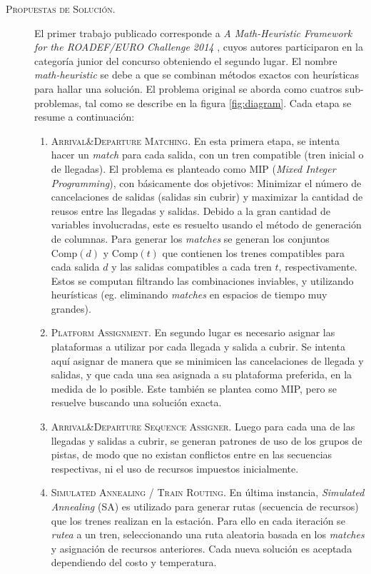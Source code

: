 \documentclass[letter, 10pt]{article}
\begin{document}
\begin{description}
    \item[\textsc{Propuestas de Solución.}]
    El primer trabajo publicado corresponde a \textit{A Math-Heuristic Framework for the ROADEF/EURO Challenge 2014} \cite{MathHeuristic}, cuyos autores participaron en la categoría junior del concurso obteniendo el segundo lugar. El nombre \textit{math-heuristic} se debe a que se combinan métodos exactos con heurísticas para hallar una solución. El problema original se aborda como cuatros sub-problemas, tal como se describe en la figura \ref{fig:diagram}. Cada etapa se resume a continuación:
    \begin{enumerate}
        \item \textsc{Arrival\&Departure Matching}. En esta primera etapa, se intenta hacer un \textit{match} para cada salida, con un tren compatible (tren inicial o de llegadas). El problema es planteado como MIP (\textit{Mixed Integer Programming}), con básicamente dos objetivos: Minimizar el número de cancelaciones de salidas (salidas sin cubrir) y maximizar la cantidad de reusos entre las llegadas y salidas. Debido a la gran cantidad de variables involucradas, este es resuelto usando el método de generación de columnas. Para generar los \textit{matches} se generan los conjuntos $\text{Comp}(d)$ y $\text{Comp}(t)$ que contienen los trenes compatibles para cada salida $d$ y las salidas compatibles a cada tren $t$, respectivamente. Estos se computan filtrando las combinaciones inviables, y utilizando heurísticas (eg. eliminando \textit{matches} en espacios de tiempo muy grandes).
        \item \textsc{Platform Assignment}. En segundo lugar es necesario asignar las plataformas a utilizar por cada llegada y salida a cubrir. Se intenta aquí asignar de manera que se minimicen las cancelaciones de llegada y salidas, y que cada una sea asignada a su plataforma preferida, en la medida de lo posible. Este también se plantea como MIP, pero se resuelve buscando una solución exacta.
        \item \textsc{Arrival\&Departure Sequence Assigner}. Luego para cada una de las llegadas y salidas a cubrir, se generan patrones de uso de los grupos de pistas, de modo que no existan conflictos entre en las secuencias respectivas, ni el uso de recursos impuestos inicialmente.
        \item \textsc{Simulated Annealing / Train Routing}. En última instancia, \textit{Simulated Annealing} (SA) es utilizado para generar rutas (secuencia de recursos) que los trenes realizan en la estación. Para ello en cada iteración se \textit{rutea} a un tren, seleccionando una ruta aleatoria basada en los \textit{matches} y asignación de recursos anteriores. Cada nueva solución es aceptada dependiendo del costo y temperatura.

\end{enumerate}
\end{description}
\end{document}

